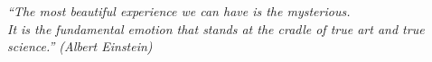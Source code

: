 \begin{epigrafe}
  \vspace*{\fill}
	\begin{flushright}
		\textit{``The most beautiful experience we can have is the mysterious.\\
		It is the fundamental emotion that stands at the cradle of true art and true science.''
		(Albert Einstein)}
	\end{flushright}
\end{epigrafe}
